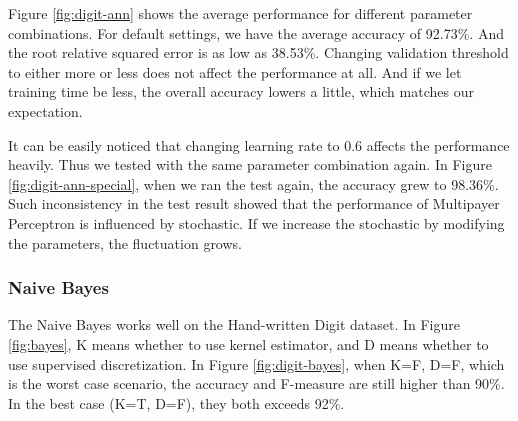 \documentclass[11pt]{article}
\begin{document}
Figure \ref{fig:digit-ann} shows the average performance for different parameter combinations. For default settings, we have the average accuracy of 92.73\%. And the root relative squared error is as low as 38.53\%. Changing validation threshold to either more or less does not affect the performance at all. And if we let training time be less, the overall accuracy lowers a little, which matches our expectation.

It can be easily noticed that changing learning rate to 0.6 affects the performance heavily. Thus we tested with the same parameter combination again. In Figure \ref{fig:digit-ann-special}, when we ran the test again, the accuracy grew to 98.36\%. Such inconsistency in the test result showed that the performance of Multipayer Perceptron is influenced by stochastic. If we increase the stochastic by modifying the parameters, the fluctuation grows.



\subsubsection{Naive Bayes}
The Naive Bayes works well on the Hand-written Digit dataset. In Figure \ref{fig:bayes}, K means whether to use kernel estimator, and D means whether to use supervised discretization. In Figure \ref{fig:digit-bayes}, when K=F, D=F, which is the worst case scenario, the accuracy and F-measure are still higher than 90\%. In the best case (K=T, D=F), they both exceeds 92\%.
\end{document}
